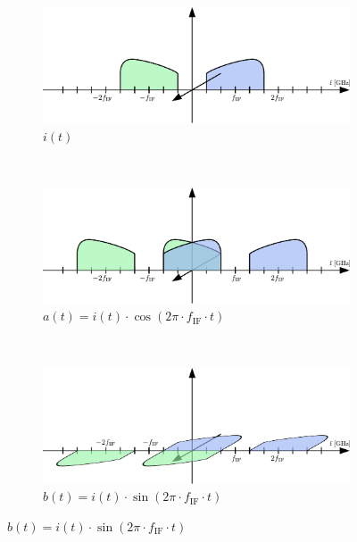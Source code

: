 \begin{figure}[ht]
  \centering
  \begin{subfigure}{0.45\textwidth}
    \centering
    \includegraphics[width=\textwidth]{figures/rx_adc_1_freq_i}
    \caption{$i(t)$}
    \label{fig:rx_adc_1_freq_s}
  \end{subfigure}
  \vspace{4ex} \\
  \begin{subfigure}{0.45\textwidth}
    \centering
    \includegraphics[width=\textwidth]{figures/rx_adc_1_freq_a}
    \caption{$a(t) = i(t) \cdot \cos(2\pi \cdot f_{\text{IF}} \cdot t)$}
    \label{fig:rx_adc_1_freq_a}
  \end{subfigure}
  ~
  \begin{subfigure}{0.45\textwidth}
    \centering
    \includegraphics[width=\textwidth]{figures/rx_adc_1_freq_b}
    \caption{$b(t) = i(t) \cdot \sin(2\pi \cdot f_{\text{IF}} \cdot t)$}
    \label{fig:rx_adc_1_freq_b}
  \end{subfigure}

\end{figure}

